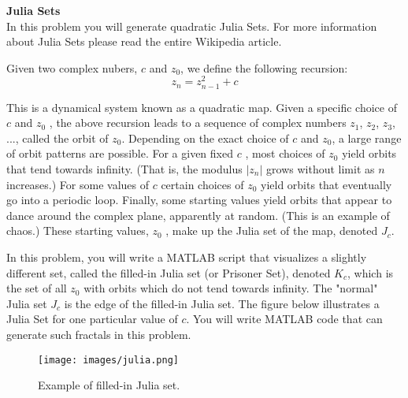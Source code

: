 \documentclass[12pt]{TDTP}
\begin{document}
\Exo
\textbf{Julia Sets}\\
In this problem you will generate quadratic Julia Sets. 
For more information about Julia Sets please read the entire  Wikipedia article.

Given two complex nubers, $c$ and $z_0$, we define the following recursion:
$$
z_n = z_{n-1}^2 +c
$$

This is a dynamical system known as a quadratic map. Given a specific choice of $c$ and $z_0$ , the above recursion leads to a sequence of complex numbers $z_1$, $z_2$, $z_3$, ..., called the orbit of $z_0$.
Depending on the exact choice of $c$ and $z_0$, a large range of orbit patterns are possible. 
For a given fixed $c$ , most choices of $z_0$ yield orbits that tend towards infinity. (That is, the modulus $|z_n|$ grows without limit as $n$ increases.)
For some values of $c$ certain choices of $z_0$ yield orbits that eventually go into a periodic loop. Finally, some starting values yield orbits that appear to dance around the complex plane, apparently at random. (This is an example of chaos.) 
These starting values, $z_0$ , make up the Julia set of the map, denoted $J_c$. 

In this problem, you will write a MATLAB script that visualizes a slightly different set, called the filled-in Julia set (or Prisoner Set), denoted $K_c$, which is the set of all $z_0$ with orbits which do not tend towards infinity.
The "normal" Julia set $J_c$ is the edge of the filled-in Julia set. The figure below illustrates a Julia Set for one particular value of $c$.
You will write MATLAB code that can generate such fractals in this problem.

\begin{figure}[h!]
\begin{center}
\texttt{[image: images/julia.png]}
\caption{Example of filled-in Julia set.}
\end{center}
\end{figure}
\end{document}

